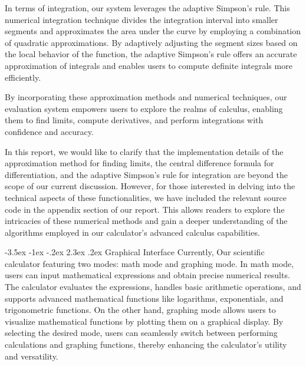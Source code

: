 \documentclass[a4paper, twoside]{report}
\makeatletter
\renewcommand\section{\@startsection {section}{1}{-1em}%
  {-3.5ex \@plus -1ex \@minus -.2ex}%
  {2.3ex \@plus.2ex}%
  {\normalfont\Large\bfseries}}
\makeatother
\begin{document}
In terms of integration, our system leverages the adaptive Simpson's rule. This numerical integration technique divides the integration interval into smaller segments and approximates the area under the curve by employing a combination of quadratic approximations. By adaptively adjusting the segment sizes based on the local behavior of the function, the adaptive Simpson's rule offers an accurate approximation of integrals and enables users to compute definite integrals more efficiently.

By incorporating these approximation methods and numerical techniques, our evaluation system empowers users to explore the realms of calculus, enabling them to find limits, compute derivatives, and perform integrations with confidence and accuracy.

In this report, we would like to clarify that the implementation details of the approximation method for finding limits, the central difference formula for differentiation, and the adaptive Simpson's rule for integration are beyond the scope of our current discussion. However, for those interested in delving into the technical aspects of these functionalities, we have included the relevant source code in the appendix section of our report. This allows readers to explore the intricacies of these numerical methods and gain a deeper understanding of the algorithms employed in our calculator's advanced calculus capabilities.

\section{Graphical Interface}
Currently, Our scientific calculator featuring two modes: math mode and graphing mode. In math mode, users can input mathematical expressions and obtain precise numerical results. The calculator evaluates the expressions, handles basic arithmetic operations, and supports advanced mathematical functions like logarithms, exponentials, and trigonometric functions. On the other hand, graphing mode allows users to visualize mathematical functions by plotting them on a graphical display. By selecting the desired mode, users can seamlessly switch between performing calculations and graphing functions, thereby enhancing the calculator's utility and versatility.
\end{document}
